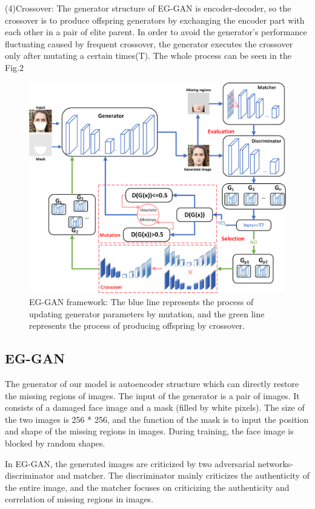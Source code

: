 \documentclass[journal]{IEEEtran}
\begin{document}
(4)Crossover: The generator structure of EG-GAN is encoder-decoder, so the crossover is to produce offspring generators by exchanging the encoder part with each other in a pair of elite parent. In order to avoid the generator's performance fluctuating caused by frequent crossover, the generator executes the crossover only after mutating a certain times(T). The whole process can be seen in the Fig.2
\begin{figure}[H]
\centering
\includegraphics[width=1\linewidth]{figures/Fig1.png}
\caption{EG-GAN framework: The blue line represents the process of updating generator parameters by mutation, and the green line represents the process of producing offspring by crossover.}
\label{fig:Fig1}
\end{figure}
\subsection{EG-GAN}
The generator of our model is autoencoder structure which can directly restore the missing regions of images. The input of the generator is a pair of images. It consists of a damaged face image and a mask (filled by white pixels). The size of the two images is 256 * 256, and the function of the mask is to input the position and shape of the missing regions in images. During training, the face image is blocked by random shapes.

In EG-GAN, the generated images are criticized by two adversarial networks-discriminator and matcher. The discriminator mainly criticizes the authenticity of the entire image, and the matcher focuses on criticizing the authenticity and correlation of missing regions in images.
\end{document}
